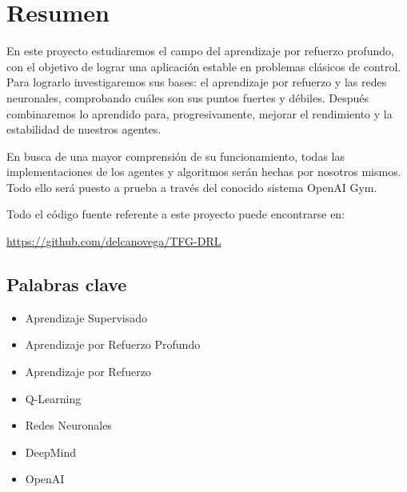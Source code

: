 \chapter*{Resumen}

En este proyecto estudiaremos el campo del aprendizaje por refuerzo profundo, con el objetivo de lograr una aplicación estable en problemas clásicos de control. Para lograrlo investigaremos sus bases: el aprendizaje por refuerzo y las redes neuronales, comprobando cuáles son sus puntos fuertes y débiles. Después combinaremos lo aprendido para, progresivamente, mejorar el rendimiento y la estabilidad de nuestros agentes.

En busca de una mayor comprensión de su funcionamiento, todas las implementaciones de los agentes y algoritmos serán hechas por nosotros mismos. Todo ello será puesto a prueba a través del conocido sistema OpenAI Gym.

Todo el código fuente referente a este proyecto puede encontrarse en:

\url{https://github.com/delcanovega/TFG-DRL}

\section*{Palabras clave}
   
\begin{itemize}
    \item Aprendizaje Supervisado
    \item Aprendizaje por Refuerzo Profundo
    \item Aprendizaje por Refuerzo
    \item Q-Learning
    \item Redes Neuronales
    \item DeepMind 
    \item OpenAI
\end{itemize}